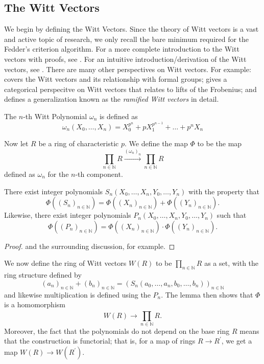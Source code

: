 
\subsection{The Witt Vectors}

We begin by defining the Witt Vectors. 
Since the theory of Witt vectors is a vast and active topic of research,
we only recall the bare minimum 
required for the Fedder's criterion algorithm.
For a more complete introduction to the Witt vectors with proofs, 
see \cite{rabinoff-2014-witt-vec}.
For an intuitive introduction/derivation of the Witt vectors, see
\cite{kim-2017-witt-vec}.
There are many other perspectives on Witt vectors. 
For example:
\cite[Chapter~17]{hazewinkel-1978-formal-groups} covers the Witt vectors
and its relationship with formal groups; 
\cite{kedlaya-2021-prismatic} gives a categorical perspecitve on Witt vectors
that relates to lifts of the Frobenius; and
\cite[Chapter~1]{schneider-2017-galois-rep-phi-gamma} defines a generalization
known as the \textit{ramified Witt vectors} in detail.

\begin{defn}
	The \(n\)-th Witt Polynomial \(\omega_{n}\) is defined as
	\[
		\omega_{n}(X_{0}, \ldots, X_{n}) = X_{0}^{p^{n}} + pX_{1}^{p^{n-1}} + \ldots + p^{n}X_{n}
	\] 
\end{defn}

Now let \(R\) be a ring of characteristic \(p\).
We define the map \(\Phi\) to be the map 
\[
	\prod_{n \in \mathbb{N}}^{} R 
	\xrightarrow{(\omega_{n})_{n}} 
	\prod_{n \in \mathbb{N}}^{} R  
\] 
defined as \(\omega_{n}\) for the \(n\)-th component.

\begin{lem}
	There exist integer polynomials 
	\(S_n(X_{0}, \ldots, X_{n}, Y_{0}, \ldots, Y_{n})\) 
	with the property that 
	\[
		\Phi((S_{n})_{n \in \mathbb{N}}) =
		\Phi((X_{n})_{n \in \mathbb{N}}) 
		+ \Phi((Y_{n})_{n \in \mathbb{N}})
	.\] 
	Likewise, there exist integer polynomials 
	\(P_{n}(X_{0}, \ldots, X_{n}, Y_{0}, \ldots, Y_{n})\)
	such that
	\[
		\Phi((P_{n})_{n \in \mathbb{N}}) =
		\Phi((X_{n})_{n \in \mathbb{N}}) 
		\cdot \Phi((Y_{n})_{n \in \mathbb{N}})
	.\] 
\end{lem}

\begin{proof}
	\cite[Theorem~2.6]{rabinoff-2014-witt-vec} and the 
	surrounding discussion, for example.
\end{proof}

We now define the ring of Witt vectors 
\(W(R)\) to be 
\(\prod_{n \in \mathbb{N}}^{} R \) 
as a set, with the ring structure defined
by 
\[
	(a_{n})_{n \in \mathbb{N}} + 
	(b_{n})_{n \in \mathbb{N}} =
	(S_{n}(a_{0}, \ldots, a_{n}, b_{0}, \ldots, b_{n}))_{n \in \mathbb{N}}
\] 
and likewise multiplication is defined
using the \(P_{n}\).
The lemma then shows that \(\Phi\) is a homomorphism 
\[
	W(R) \xrightarrow{} \prod_{n \in \mathbb{N}}^{} R 
.\] 
Moreover, the fact that the polynomials do not depend on the base
ring \(R\) means that the construction is functorial; that is,
for a map of rings \(R \xrightarrow{} R^{\prime} \), we get a 
map \(W(R) \xrightarrow{} W(R^{\prime})\).

